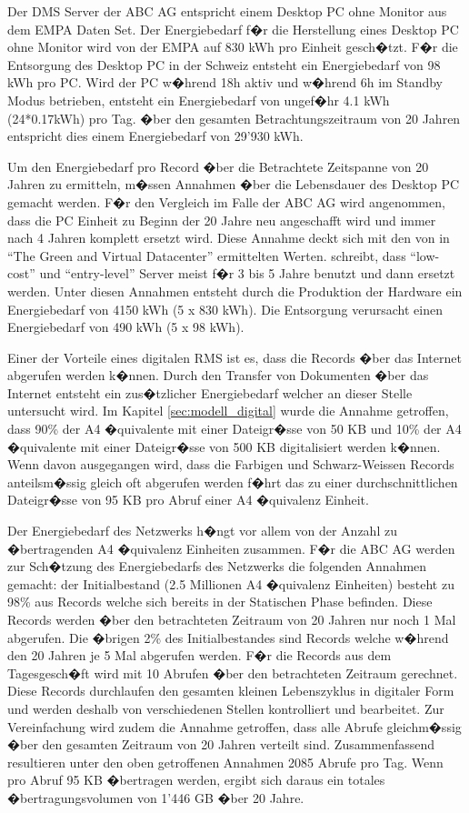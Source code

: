 \documentclass[a4paper,twoside,10pt]{report}
\begin{document}
Der \ac{DMS} Server der ABC AG entspricht einem Desktop PC ohne Monitor aus dem \ac{EMPA} Daten Set. Der Energiebedarf f�r die Herstellung eines Desktop PC ohne Monitor wird von der \ac{EMPA} auf 830 kWh pro Einheit gesch�tzt. F�r die Entsorgung des Desktop PC in der Schweiz entsteht ein Energiebedarf von 98 kWh pro PC. Wird der PC w�hrend 18h aktiv und w�hrend 6h im Standby Modus betrieben, entsteht ein Energiebedarf von ungef�hr 4.1 kWh (24*0.17kWh) pro Tag. �ber den gesamten Betrachtungszeitraum von 20 Jahren entspricht dies einem Energiebedarf von 29'930 kWh. \cite{empa_daten}

Um den Energiebedarf pro Record �ber die Betrachtete Zeitspanne von 20 Jahren zu ermitteln, m�ssen Annahmen �ber die Lebensdauer des Desktop PC gemacht werden. F�r den Vergleich im Falle der ABC AG wird angenommen, dass die PC Einheit zu Beginn der 20 Jahre neu angeschafft wird und immer nach 4 Jahren komplett ersetzt wird. Diese Annahme deckt sich mit den von \citeauthor{greendc} in "`The Green and Virtual Datacenter"' ermittelten Werten. \citeauthor{greendc} schreibt, dass "`low-cost"' und "`entry-level"' Server meist f�r 3 bis 5 Jahre benutzt und dann ersetzt werden. Unter diesen Annahmen entsteht durch die Produktion der Hardware ein Energiebedarf von 4150 kWh (5 x 830 kWh). Die Entsorgung verursacht einen Energiebedarf von 490 kWh (5 x 98 kWh). \cite{greendc}

Einer der Vorteile eines digitalen \ac{RMS} ist es, dass die Records �ber das Internet abgerufen werden k�nnen. Durch den Transfer von Dokumenten �ber das Internet entsteht ein zus�tzlicher Energiebedarf welcher an dieser Stelle untersucht wird. Im Kapitel \ref{sec:modell_digital} wurde die Annahme getroffen, dass 90\% der A4 �quivalente mit einer Dateigr�sse von 50 KB und 10\% der A4 �quivalente mit einer Dateigr�sse von 500 KB digitalisiert werden k�nnen. Wenn davon ausgegangen wird, dass die Farbigen und Schwarz-Weissen Records anteilsm�ssig gleich oft abgerufen werden f�hrt das zu einer durchschnittlichen Dateigr�sse von 95 KB pro Abruf einer A4 �quivalenz Einheit. 

Der Energiebedarf des Netzwerks h�ngt vor allem von der Anzahl zu �bertragenden A4 �quivalenz Einheiten zusammen. F�r die ABC AG werden zur Sch�tzung des Energiebedarfs des Netzwerks die folgenden Annahmen gemacht: der Initialbestand (2.5 Millionen A4 �quivalenz Einheiten) besteht zu 98\% aus Records welche sich bereits in der Statischen Phase befinden. Diese Records werden �ber den betrachteten Zeitraum von 20 Jahren nur noch 1 Mal abgerufen. Die �brigen 2\% des Initialbestandes sind Records welche w�hrend den 20 Jahren je 5 Mal abgerufen werden. F�r die Records aus dem Tagesgesch�ft wird mit 10 Abrufen �ber den betrachteten Zeitraum gerechnet. Diese Records durchlaufen den gesamten kleinen Lebenszyklus in digitaler Form und werden deshalb von verschiedenen Stellen kontrolliert und bearbeitet. Zur Vereinfachung wird zudem die Annahme getroffen, dass alle Abrufe gleichm�ssig �ber den gesamten Zeitraum von 20 Jahren verteilt sind. Zusammenfassend resultieren unter den oben getroffenen Annahmen 2085 Abrufe pro Tag. Wenn pro Abruf 95 KB �bertragen werden, ergibt sich daraus ein totales �bertragungsvolumen von 1'446 GB �ber 20 Jahre. 
\end{document}
